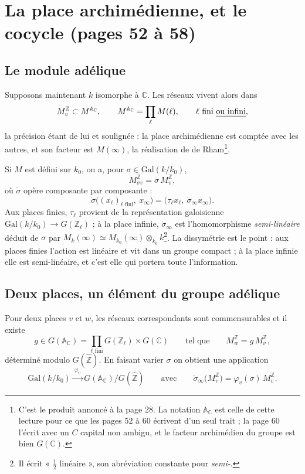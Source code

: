 \documentclass[11pt,a4paper]{article}
\begin{document}
\section*{La place archimédienne, et le cocycle (pages 52 à 58)}

\subsection*{Le module adélique}

Supposons maintenant $k$ isomorphe à $\mathbb{C}$. Les réseaux vivent alors dans
\[
  M^{\mathbb{Z}}_{v} \subset M^{\mathbb{A}_{\mathbb{C}}} ,
  \qquad
  M^{\mathbb{A}_{\mathbb{C}}} = \prod_{\ell} M(\ell) ,
  \qquad \ell \text{ fini \emph{ou infini}} ,
\]
la précision étant de lui et soulignée : la place archimédienne est comptée avec
les autres, et son facteur est $M(\infty)$, la réalisation de de
Rham\footnote{C'est le produit annoncé à la page 28. La notation
$\mathbb{A}_{\mathbb{C}}$ est celle de cette lecture pour ce que les pages 52 à
60 écrivent d'un seul trait ; la page 60 l'écrit avec un $C$ capital non
ambigu, et le facteur archimédien du groupe est bien $G(\mathbb{C})$.}.

Si $M$ est défini sur $k_{0}$, on a, pour $\sigma \in \mathrm{Gal}(k/k_{0})$,
\[
  M^{\mathbb{Z}}_{\sigma v} = \dot{\sigma}\, M^{\mathbb{Z}}_{v} ,
\]
où $\dot{\sigma}$ opère composante par composante :
\[
  \dot{\sigma}\bigl((x_{\ell})_{\ell \text{ fini}},\ x_{\infty}\bigr)
  = \bigl(\tau_{\ell} x_{\ell},\ \dot{\sigma}_{\infty} x_{\infty}\bigr) .
\]
Aux places finies, $\tau_{\ell}$ provient de la représentation galoisienne
$\mathrm{Gal}(k/k_{0}) \to G(\mathbb{Z}_{\ell})$ ; à la place infinie,
$\dot{\sigma}_{\infty}$ est l'homomorphisme \emph{semi-linéaire} déduit de
$\sigma$ par $M_{k}(\infty) \simeq M_{k_{0}}(\infty) \otimes_{k_{0}}
k$\footnote{Il écrit « $\tfrac{1}{2}$ linéaire », son abréviation constante pour
\emph{semi-}.}. La dissymétrie est le point : aux places finies l'action est
linéaire et vit dans un groupe compact ; à la place infinie elle est
semi-linéaire, et c'est elle qui portera toute l'information.

\subsection*{Deux places, un élément du groupe adélique}

Pour deux places $v$ et $w$, les réseaux correspondants sont commensurables et
il existe
\[
  g \in G(\mathbb{A}_{\mathbb{C}})
  = \prod_{\ell \text{ fini}} G(\mathbb{Z}_{\ell}) \times G(\mathbb{C})
  \qquad \text{tel que} \qquad
  M^{\mathbb{Z}}_{w} = g\, M^{\mathbb{Z}}_{v} ,
\]
déterminé modulo $G(\widehat{\mathbb{Z}})$. En faisant varier $\sigma$ on
obtient une application
\[
  \mathrm{Gal}(k/k_{0}) \xrightarrow{\ \varphi_{v}\ }
  G(\mathbb{A}_{\mathbb{C}})/G(\widehat{\mathbb{Z}})
  \qquad \text{avec} \qquad
  \dot{\sigma}_{\infty}\bigl(M^{\mathbb{Z}}_{v}\bigr)
  = \varphi_{v}(\sigma)\, M^{\mathbb{Z}}_{v} .
\]
\end{document}
